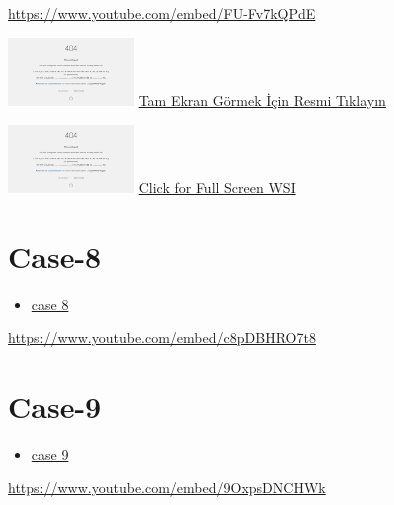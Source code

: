 \documentclass[
  letterpaper,
  paper=6in:9in,
  pagesize=pdftex,
  headinclude=on,
  footinclude=on,
  12pt]{scrbook}
\providecommand{\tightlist}{%
  \setlength{\itemsep}{0pt}\setlength{\parskip}{0pt}}\usepackage{longtable,booktabs,array}
\begin{document}
\url{https://www.youtube.com/embed/FU-Fv7kQPdE}

\href{https://images.patolojiatlasi.com/hacettepe-com-case-7/HE.html}{\includegraphics[width=0.25\textwidth,height=\textheight]{./screenshots/hacettepe-com-case-7_screenshot.png}}
\href{https://images.patolojiatlasi.com/hacettepe-com-case-7/HE.html}{Tam
Ekran Görmek İçin Resmi Tıklayın}

\href{https://images.patolojiatlasi.com/hacettepe-com-case-7/HE.html}{\includegraphics[width=0.25\textwidth,height=\textheight]{./screenshots/hacettepe-com-case-7_screenshot.png}}
\href{https://images.patolojiatlasi.com/hacettepe-com-case-7/HE.html}{Click
for Full Screen WSI}

\hypertarget{sec-hacettepe-case-of-the-month-case-8}{%
\section{Case-8}\label{sec-hacettepe-case-of-the-month-case-8}}

\begin{itemize}
\tightlist
\item
  \href{https://www.youtube.com/watch?v=c8pDBHRO7t8\&ab_channel=KemalKosemehmetoglu}{case
  8}
\end{itemize}

\url{https://www.youtube.com/embed/c8pDBHRO7t8}

\hypertarget{sec-hacettepe-case-of-the-month-case-9}{%
\section{Case-9}\label{sec-hacettepe-case-of-the-month-case-9}}

\begin{itemize}
\tightlist
\item
  \href{https://www.youtube.com/watch?v=9OxpsDNCHWk\&ab_channel=KemalKosemehmetoglu}{case
  9}
\end{itemize}

\url{https://www.youtube.com/embed/9OxpsDNCHWk}
\end{document}
